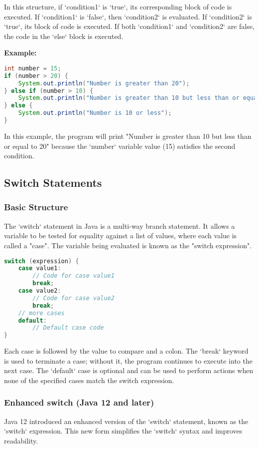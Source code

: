 \documentclass{article}
\begin{document}
In this structure, if `condition1` is `true`, its corresponding block of code is executed. If `condition1` is `false`, then `condition2` is evaluated. If `condition2` is `true`, its block of code is executed. If both `condition1` and `condition2` are false, the code in the `else` block is executed.

\textbf{Example:}

\begin{lstlisting}[language=Java]
int number = 15;
if (number > 20) {
    System.out.println("Number is greater than 20");
} else if (number > 10) {
    System.out.println("Number is greater than 10 but less than or equal to 20");
} else {
    System.out.println("Number is 10 or less");
}
\end{lstlisting}

In this example, the program will print "Number is greater than 10 but less than or equal to 20" because the `number` variable value (15) satisfies the second condition.


\newpage
\subsection{Switch Statements}
\subsubsection{Basic Structure}
The `switch` statement in Java is a multi-way branch statement. It allows a variable to be tested for equality against a list of values, where each value is called a "case". The variable being evaluated is known as the "switch expression".

\begin{lstlisting}[language=Java]
switch (expression) {
    case value1:
        // Code for case value1
        break;
    case value2:
        // Code for case value2
        break;
    // more cases
    default:
        // Default case code
}
\end{lstlisting}

Each case is followed by the value to compare and a colon. The `break` keyword is used to terminate a case; without it, the program continues to execute into the next case. The `default` case is optional and can be used to perform actions when none of the specified cases match the switch expression.

\subsubsection{Enhanced switch (Java 12 and later)}
Java 12 introduced an enhanced version of the `switch` statement, known as the `switch` expression. This new form simplifies the `switch` syntax and improves readability.
\end{document}
